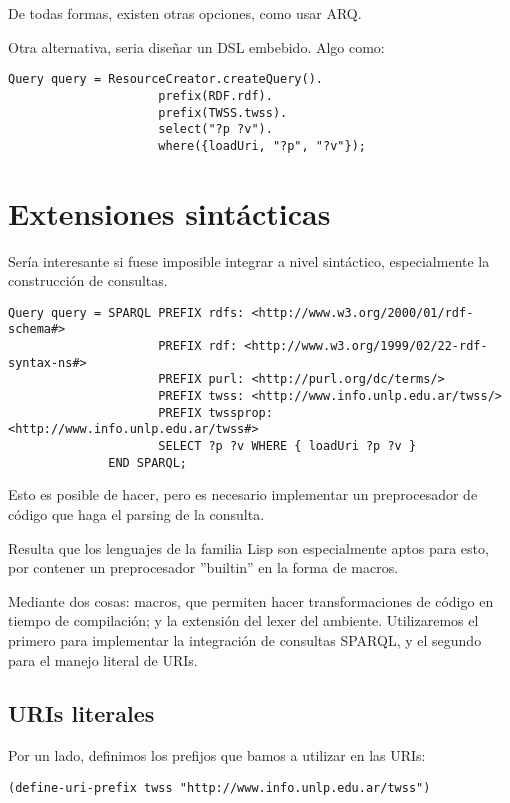 \documentclass[12pt]{article}
\begin{document}
De todas formas, existen otras opciones, como usar ARQ.

Otra alternativa, seria diseñar un DSL embebido. Algo como:

\begin{lstlisting}
Query query = ResourceCreator.createQuery().
                     prefix(RDF.rdf).
                     prefix(TWSS.twss).
                     select("?p ?v").
                     where({loadUri, "?p", "?v"});
\end{lstlisting}		

\section{Extensiones sint\'acticas}

Ser\'ia interesante si fuese imposible integrar a nivel sint\'actico, especialmente la construcci\'on de consultas.

\begin{lstlisting}
Query query = SPARQL PREFIX rdfs: <http://www.w3.org/2000/01/rdf-schema#>
		             PREFIX rdf: <http://www.w3.org/1999/02/22-rdf-syntax-ns#>
		             PREFIX purl: <http://purl.org/dc/terms/>
		             PREFIX twss: <http://www.info.unlp.edu.ar/twss/>
		             PREFIX twssprop: <http://www.info.unlp.edu.ar/twss#>
		             SELECT ?p ?v WHERE { loadUri ?p ?v }
		      END SPARQL;
\end{lstlisting}

Esto es posible de hacer, pero es necesario implementar un preprocesador de c\'odigo que haga el parsing de la consulta.

Resulta que los lenguajes de la familia Lisp son especialmente aptos para esto, por contener un preprocesador ''builtin'' en la forma de macros. 

Mediante dos cosas: macros, que permiten hacer transformaciones de c\'odigo en tiempo de compilaci\'on; y la extensi\'on del lexer del ambiente. Utilizaremos el primero para implementar la integraci\'on de consultas SPARQL, y el segundo para el manejo literal de URIs. 

\subsection{URIs literales}

Por un lado, definimos los prefijos que bamos a utilizar en las URIs:

\begin{lstlisting}
(define-uri-prefix twss "http://www.info.unlp.edu.ar/twss")
\end{lstlisting}
\end{document}
